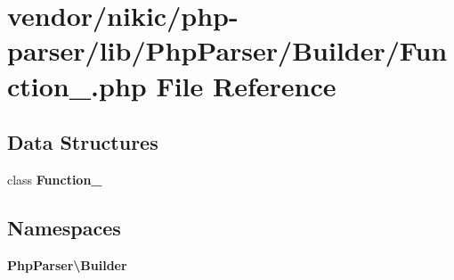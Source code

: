 \section{vendor/nikic/php-\/parser/lib/\+Php\+Parser/\+Builder/\+Function\+\_\+.php File Reference}
\label{_builder_2_function___8php}
\subsection*{Data Structures}
\begin{DoxyCompactItemize}
\item 
class {\bf Function\+\_\+}
\end{DoxyCompactItemize}
\subsection*{Namespaces}
\begin{DoxyCompactItemize}
\item 
 {\bf Php\+Parser\textbackslash{}\+Builder}
\end{DoxyCompactItemize}
